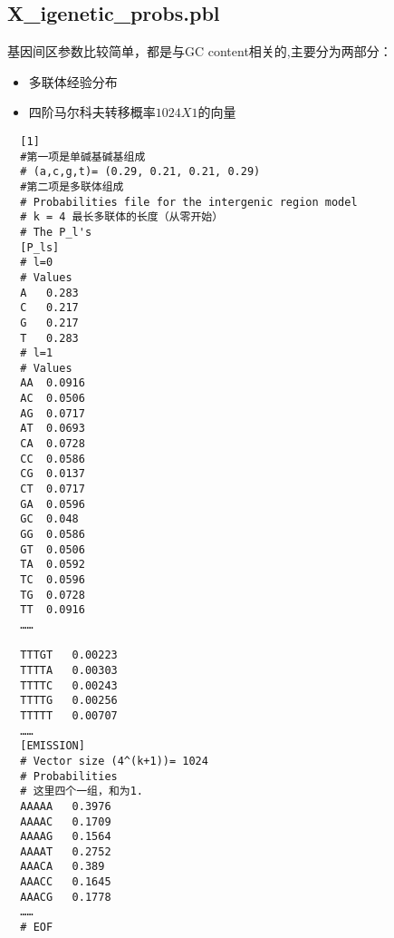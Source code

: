 \documentclass{article} \usepackage{amsmath}
\begin{document}
\subsection{X\_igenetic\_probs.pbl}
基因间区参数比较简单，都是与GC content相关的,主要分为两部分：
\begin{itemize}
\item 多联体经验分布
\item 四阶马尔科夫转移概率\(1024X1的向量\)
\end{itemize}	
\begin{lstlisting}
  [1]
  #第一项是单碱基碱基组成
  # (a,c,g,t)= (0.29, 0.21, 0.21, 0.29)
  #第二项是多联体组成
  # Probabilities file for the intergenic region model
  # k = 4 最长多联体的长度（从零开始）
  # The P_l's
  [P_ls]
  # l=0
  # Values
  A   0.283
  C   0.217
  G   0.217
  T   0.283
  # l=1
  # Values
  AA  0.0916
  AC  0.0506
  AG  0.0717
  AT  0.0693
  CA  0.0728
  CC  0.0586
  CG  0.0137
  CT  0.0717
  GA  0.0596
  GC  0.048
  GG  0.0586
  GT  0.0506
  TA  0.0592
  TC  0.0596
  TG  0.0728
  TT  0.0916
  ……

  TTTGT   0.00223
  TTTTA   0.00303
  TTTTC   0.00243
  TTTTG   0.00256
  TTTTT   0.00707
  ……
  [EMISSION]
  # Vector size (4^(k+1))= 1024
  # Probabilities
  # 这里四个一组，和为1.
  AAAAA   0.3976
  AAAAC   0.1709
  AAAAG   0.1564
  AAAAT   0.2752
  AAACA   0.389
  AAACC   0.1645
  AAACG   0.1778
  ……
  # EOF
\end{lstlisting}
\end{document}
